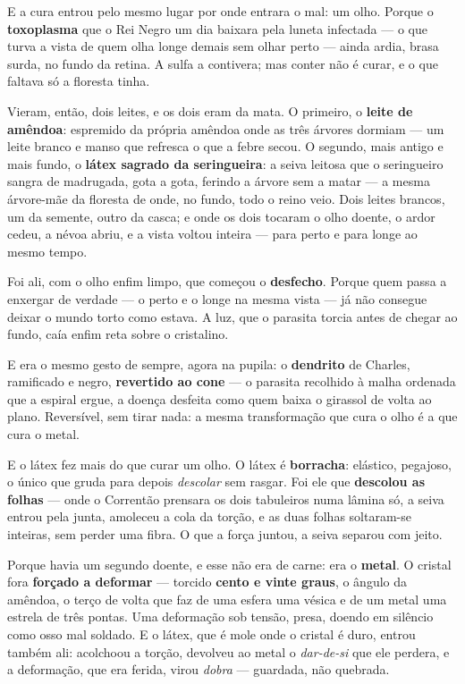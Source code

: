 \documentclass[livro.tex]{subfiles}
\begin{document}
\medskip

E a cura entrou pelo mesmo lugar por onde entrara o mal: um olho. Porque o
\textbf{toxoplasma} que o Rei Negro um dia baixara pela luneta infectada --- o que turva a vista
de quem olha longe demais sem olhar perto --- ainda ardia, brasa surda, no fundo da
retina. A sulfa a contivera; mas conter não é curar, e o que faltava só a floresta
tinha.

\medskip

Vieram, então, dois leites, e os dois eram da mata. O primeiro, o \textbf{leite de
amêndoa}: espremido da própria amêndoa onde as três árvores dormiam --- um leite branco
e manso que refresca o que a febre secou. O segundo, mais antigo e mais fundo, o
\textbf{látex sagrado da seringueira}: a seiva leitosa que o seringueiro sangra de
madrugada, gota a gota, ferindo a árvore sem a matar --- a mesma árvore-mãe da floresta
de onde, no fundo, todo o reino veio. Dois leites brancos, um da semente, outro da
casca; e onde os dois tocaram o olho doente, o ardor cedeu, a névoa abriu, e a vista
voltou inteira --- para perto e para longe ao mesmo tempo.

\medskip

Foi ali, com o olho enfim limpo, que começou o \textbf{desfecho}. Porque quem passa a
enxergar de verdade --- o perto e o longe na mesma vista --- já não consegue deixar o
mundo torto como estava. A luz, que o parasita torcia antes de chegar ao fundo, caía
enfim reta sobre o cristalino.

\medskip

E era o mesmo gesto de sempre, agora na pupila: o \textbf{dendrito} de Charles,
ramificado e negro, \textbf{revertido ao cone} --- o parasita recolhido à malha ordenada
que a espiral ergue, a doença desfeita como quem baixa o girassol de volta ao plano.
Reversível, sem tirar nada: a mesma transformação que cura o olho é a que cura o metal.

\medskip

E o látex fez mais do que curar um olho. O látex é \textbf{borracha}: elástico,
pegajoso, o único que gruda para depois \emph{descolar} sem rasgar. Foi ele que
\textbf{descolou as folhas} --- onde o Correntão prensara os dois tabuleiros numa lâmina
só, a seiva entrou pela junta, amoleceu a cola da torção, e as duas folhas soltaram-se
inteiras, sem perder uma fibra. O que a força juntou, a seiva separou com jeito.

\medskip

Porque havia um segundo doente, e esse não era de carne: era o \textbf{metal}. O cristal
fora \textbf{forçado a deformar} --- torcido \textbf{cento e vinte graus}, o ângulo da
amêndoa, o terço de volta que faz de uma esfera uma vésica e de um metal uma estrela de
três pontas. Uma deformação sob tensão, presa, doendo em silêncio como osso mal soldado.
E o látex, que é mole onde o cristal é duro, entrou também ali: acolchoou a torção,
devolveu ao metal o \emph{dar-de-si} que ele perdera, e a deformação, que era ferida,
virou \emph{dobra} --- guardada, não quebrada.
\end{document}
